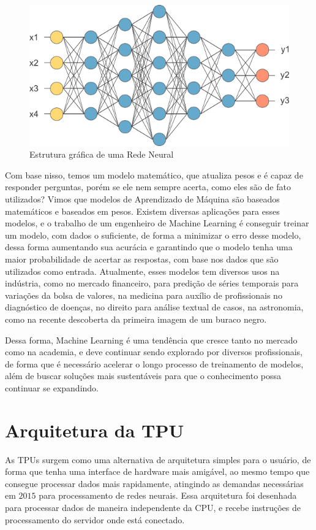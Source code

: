 \documentclass{report}
\begin{document}
\begin{figure}[h]
	\includegraphics[scale=0.7]{neuralNetwork}
	\centering
	\caption{Estrutura gráfica de uma Rede Neural}
\end{figure}

Com base nisso, temos um modelo matemático, que atualiza pesos e é capaz de responder perguntas, porém se ele nem sempre acerta, como eles são de fato utilizados? Vimos que modelos de Aprendizado de Máquina são baseados matemáticos e baseados em pesos. Existem diversas aplicações para esses modelos, e o trabalho de um engenheiro de Machine Learning é conseguir treinar um modelo, com dados o suficiente, de forma a minimizar o erro desse modelo, dessa forma aumentando sua acurácia e garantindo que o modelo tenha uma maior probabilidade de acertar as respostas, com base nos dados que são utilizados como entrada. Atualmente, esses modelos tem diversos usos na indústria, como no mercado financeiro, para predição de séries temporais para variações da bolsa de valores, na medicina para auxílio de profissionais no diagnóstico de doenças, no direito para análise textual de casos, na astronomia, como na recente descoberta da primeira imagem de um buraco negro. 

Dessa forma, Machine Learning é uma tendência que cresce tanto no mercado como na academia, e deve continuar sendo explorado por diversos profissionais, de forma que é necessário acelerar o longo processo de treinamento de modelos, além de buscar soluções mais sustentáveis para que o conhecimento possa continuar se expandindo.


\chapter{Arquitetura da TPU}

As TPUs surgem como uma alternativa de arquitetura simples para o usuário, de forma que tenha uma interface de hardware mais amigável, ao mesmo tempo que consegue processar dados mais rapidamente, atingindo as demandas necessárias em $2015$ para processamento de redes neurais. Essa arquitetura foi desenhada para processar dados de maneira independente da CPU, e recebe instruções de processamento do servidor onde está conectado.
\end{document}
